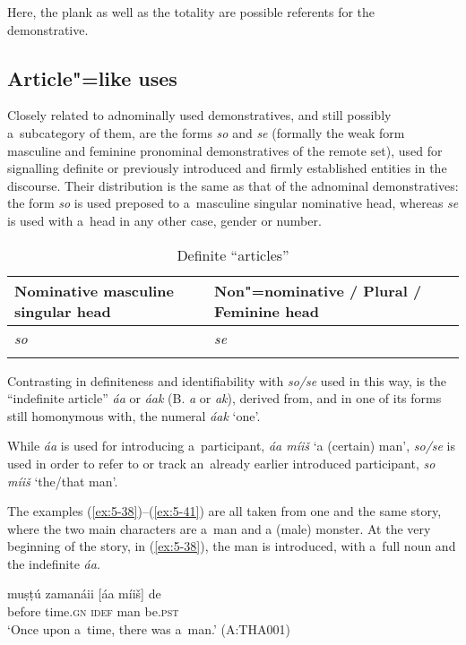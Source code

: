 Here, the plank as well as the totality are possible referents for the demonstrative.

\subsection{Article"=like uses}
\label{subsec:5-2-6}

Closely related to adnominally used demonstratives, and still possibly a~subcategory of them, are the forms \textit{so} and \textit{se} (formally the weak form masculine and feminine pronominal demonstratives of the remote set), used for signalling definite or previously introduced and firmly established entities in the discourse. Their distribution is the same as that of the adnominal demonstratives: the form \textit{so} is used preposed to a~masculine singular nominative head, whereas \textit{se} is used with a~head in any other case, gender or number. 


\begin{table}[ht]
 \caption{Definite ``articles''}
\begin{tabularx}{\textwidth}{ Q Q }
\lsptoprule
Nominative masculine singular head &
Non"=nominative / Plural / Feminine head\\\hline
\textit{so} &
\textit{se} \\\lspbottomrule
\end{tabularx}
\label{tab:5-5}
\end{table}

Contrasting in definiteness and identifiability with \textit{so/se} used in this way, is the ``indefinite article'' \textit{áa} or \textit{áak} (B. \textit{a} or \textit{ak}), derived from, and in one of its forms still homonymous with, the numeral \textit{áak} `one'.

While \textit{áa} is used for introducing a~participant, \textit{áa míiš} `a (certain) man', \textit{so/se} is used in order to refer to or track an~already earlier introduced participant, \textit{so míiš} `the/that man'.


  The examples (\ref{ex:5-38})--(\ref{ex:5-41}) are all taken from one and the same story, where the
  two main characters are a~man and a (male) monster. At the very beginning of the story, in
  (\ref{ex:5-38}), the man is introduced, with a~full noun and the indefinite \textit{áa}.

\begin{exe}
\ex
\label{ex:5-38}
\gll muṣṭú zamanáii [áa míiš] de\\
before time.\textsc{gn} \textsc{idef} man be.\textsc{pst}\\
\glt `Once upon a~time, there was a~man.' (A:THA001)
\end{exe}

